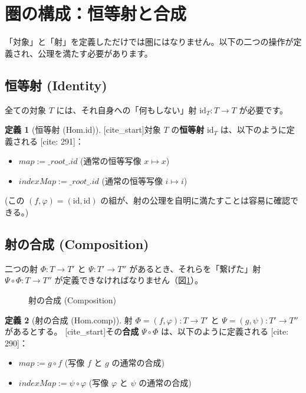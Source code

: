 \documentclass[11pt]{ltjsarticle}
\def\texttt#1{#1}%
\theoremstyle{definition}
\newtheorem{definition}{定義}[section]
\theoremstyle{plain}
\theoremstyle{remark}
\begin{document}
\section{圏の構成：恒等射と合成}

「対象」と「射」を定義しただけでは圏にはなりません。以下の二つの操作が定義され、公理を満たす必要があります。

\subsection{恒等射 (Identity)}

全ての対象 $T$ には、それ自身への「何もしない」射 $\text{id}_T: T \to T$ が必要です。

\begin{definition}[恒等射 (Hom.id)]
[cite_start]対象 $T$ の\textbf{恒等射} $\text{id}_T$ は、以下のように定義される [cite: 291]：
\begin{itemize}
    \item $\texttt{map} := \_root\_.id$ (通常の恒等写像 $x \mapsto x$)
    \item $\texttt{indexMap} := \_root\_.id$ (通常の恒等写像 $i \mapsto i$)
\end{itemize}
(この $(f, \varphi) = (\text{id}, \text{id})$ の組が、射の公理を自明に満たすことは容易に確認できる。)
\end{definition}

\subsection{射の合成 (Composition)}

二つの射 $\Phi: T \to T'$ と $\Psi: T' \to T''$ があるとき、それらを「繋げた」射 $\Psi \circ \Phi: T \to T''$ が定義できなければなりません（図\ref{fig:comp}）。

\begin{figure}[hbt]
  \centering
  \caption[\texorpdfstring{射の合成}{Composition}]{射の合成 (Composition)}
  \label{fig:comp}
\end{figure}


\begin{definition}[射の合成 (Hom.comp)]
射 $\Phi = (f, \varphi): T \to T'$ と $\Psi = (g, \psi): T' \to T''$ があるとする。
[cite_start]その\textbf{合成} $\Psi \circ \Phi$ は、以下のように定義される [cite: 290]：
\begin{itemize}
    \item $\texttt{map} := g \circ f$ (写像 $f$ と $g$ の通常の合成)
    \item $\texttt{indexMap} := \psi \circ \varphi$ (写像 $\varphi$ と $\psi$ の通常の合成)
\end{itemize}
\end{definition}
\end{document}
